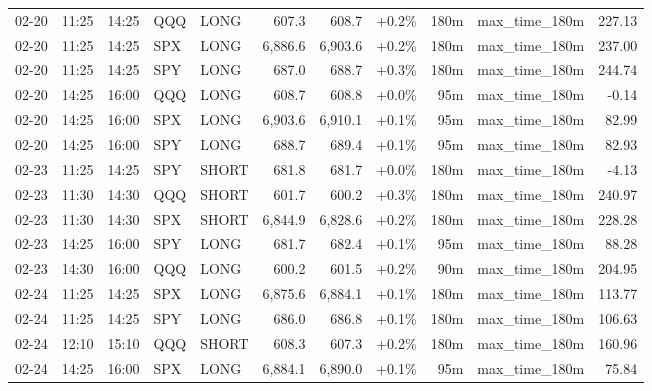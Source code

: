 \documentclass[11pt,a4paper,twoside]{article}
\begin{document}
\begin{center}
\begin{longtable}{>{\color{txtmain}}l l l l l r r r r >{\color{txtmain}}l r}
02-20 & 11:25 & 14:25 & QQQ & LONG & 607.3 & 608.7 & \textcolor{wingreen}{+0.2\%} & 180m & max\_time\_180m & \textcolor{wingreen}{227.13} \\
02-20 & 11:25 & 14:25 & SPX & LONG & 6,886.6 & 6,903.6 & \textcolor{wingreen}{+0.2\%} & 180m & max\_time\_180m & \textcolor{wingreen}{237.00} \\
02-20 & 11:25 & 14:25 & SPY & LONG & 687.0 & 688.7 & \textcolor{wingreen}{+0.3\%} & 180m & max\_time\_180m & \textcolor{wingreen}{244.74} \\
02-20 & 14:25 & 16:00 & QQQ & LONG & 608.7 & 608.8 & \textcolor{wingreen}{+0.0\%} & 95m & max\_time\_180m & \textcolor{lossred}{-0.14} \\
02-20 & 14:25 & 16:00 & SPX & LONG & 6,903.6 & 6,910.1 & \textcolor{wingreen}{+0.1\%} & 95m & max\_time\_180m & \textcolor{wingreen}{82.99} \\
02-20 & 14:25 & 16:00 & SPY & LONG & 688.7 & 689.4 & \textcolor{wingreen}{+0.1\%} & 95m & max\_time\_180m & \textcolor{wingreen}{82.93} \\
02-23 & 11:25 & 14:25 & SPY & SHORT & 681.8 & 681.7 & \textcolor{wingreen}{+0.0\%} & 180m & max\_time\_180m & \textcolor{lossred}{-4.13} \\
02-23 & 11:30 & 14:30 & QQQ & SHORT & 601.7 & 600.2 & \textcolor{wingreen}{+0.3\%} & 180m & max\_time\_180m & \textcolor{wingreen}{240.97} \\
02-23 & 11:30 & 14:30 & SPX & SHORT & 6,844.9 & 6,828.6 & \textcolor{wingreen}{+0.2\%} & 180m & max\_time\_180m & \textcolor{wingreen}{228.28} \\
02-23 & 14:25 & 16:00 & SPY & LONG & 681.7 & 682.4 & \textcolor{wingreen}{+0.1\%} & 95m & max\_time\_180m & \textcolor{wingreen}{88.28} \\
02-23 & 14:30 & 16:00 & QQQ & LONG & 600.2 & 601.5 & \textcolor{wingreen}{+0.2\%} & 90m & max\_time\_180m & \textcolor{wingreen}{204.95} \\
02-24 & 11:25 & 14:25 & SPX & LONG & 6,875.6 & 6,884.1 & \textcolor{wingreen}{+0.1\%} & 180m & max\_time\_180m & \textcolor{wingreen}{113.77} \\
02-24 & 11:25 & 14:25 & SPY & LONG & 686.0 & 686.8 & \textcolor{wingreen}{+0.1\%} & 180m & max\_time\_180m & \textcolor{wingreen}{106.63} \\
02-24 & 12:10 & 15:10 & QQQ & SHORT & 608.3 & 607.3 & \textcolor{wingreen}{+0.2\%} & 180m & max\_time\_180m & \textcolor{wingreen}{160.96} \\
02-24 & 14:25 & 16:00 & SPX & LONG & 6,884.1 & 6,890.0 & \textcolor{wingreen}{+0.1\%} & 95m & max\_time\_180m & \textcolor{wingreen}{75.84} \\

\end{longtable}
\end{center}
\end{document}
